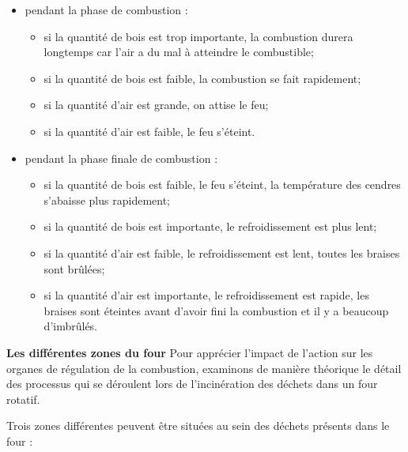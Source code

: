  
\begin{itemize}
    \item pendant la phase de combustion :
\begin{itemize}

\item  si la quantité de bois est trop importante, la combustion durera longtemps car l’air a du mal à atteindre le combustible;
\item  si la quantité de bois est faible, la combustion se fait rapidement;
\item  si la quantité d’air est grande, on attise le feu;
\item  si la quantité d’air est faible, le feu s’éteint.

\end{itemize}

\end{itemize}

\begin{itemize}
\item pendant la phase finale de combustion :
\begin{itemize}
\item  si la quantité de bois est faible, le feu s’éteint, la température des cendres s’abaisse plus rapidement;
\item  si la quantité de bois est importante, le refroidissement est plus lent;
\item  si la quantité d’air est faible, le refroidissement est lent, toutes les braises sont brûlées;
\item  si la quantité d’air est importante, le refroidissement est rapide, les braises sont éteintes avant d’avoir fini la combustion et il y a beaucoup d’imbrûlés.

\end{itemize}
\end{itemize}




\vspace{0.3cm}
\textbf{Les différentes zones du four}
\vspace{0.3cm}
Pour apprécier l’impact de l’action sur les organes de régulation de la combustion, examinons de manière théorique le détail des processus qui se déroulent lors de l’incinération des déchets dans un four rotatif.

\vspace{0.3cm}

Trois zones différentes peuvent être situées au sein des déchets présents dans le four :

